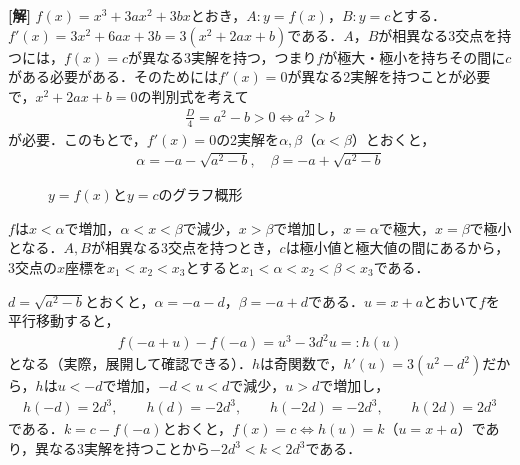 \documentclass[../main.tex]{subfiles}
\begin{document}
{\bf [解]}
$f(x)=x^3+3ax^2+3bx$とおき，$A:y=f(x)$，$B:y=c$とする．$f'(x)=3x^2+6ax+3b=3(x^2+2ax+b)$である．$A$，$B$が相異なる3交点を持つには，$f(x)=c$が異なる3実解を持つ，つまり$f$が極大・極小を持ちその間に$c$がある必要がある．そのためには$f'(x)=0$が異なる2実解を持つことが必要で，$x^2+2ax+b=0$の判別式を考えて
\begin{align*}
  \frac{D}4=a^2-b>0\iff a^2>b
\end{align*}
が必要．このもとで，$f'(x)=0$の2実解を$\alpha,\beta$（$\alpha<\beta$）とおくと，
\begin{align*}
  \alpha=-a-\sqrt{a^2-b},\quad\beta=-a+\sqrt{a^2-b}
\end{align*}

\begin{figure}[htb]
  \centering
  \caption{$y=f(x)$と$y=c$のグラフ概形}
\end{figure}

$f$は$x<\alpha$で増加，$\alpha<x<\beta$で減少，$x>\beta$で増加し，$x=\alpha$で極大，$x=\beta$で極小となる．$A,B$が相異なる3交点を持つとき，$c$は極小値と極大値の間にあるから，3交点の$x$座標を$x_1<x_2<x_3$とすると$x_1<\alpha<x_2<\beta<x_3$である．

$d=\sqrt{a^2-b}$とおくと，$\alpha=-a-d$，$\beta=-a+d$である．$u=x+a$とおいて$f$を平行移動すると，
\begin{align*}
  f(-a+u)-f(-a)=u^3-3d^2u=:h(u)
\end{align*}
となる（実際，展開して確認できる）．$h$は奇関数で，$h'(u)=3(u^2-d^2)$だから，$h$は$u<-d$で増加，$-d<u<d$で減少，$u>d$で増加し，
\begin{align*}
  h(-d)=2d^3,\qquad h(d)=-2d^3,\qquad h(-2d)=-2d^3,\qquad h(2d)=2d^3
\end{align*}
である．$k=c-f(-a)$とおくと，$f(x)=c\iff h(u)=k$（$u=x+a$）であり，異なる3実解を持つことから$-2d^3<k<2d^3$である．
\end{document}
